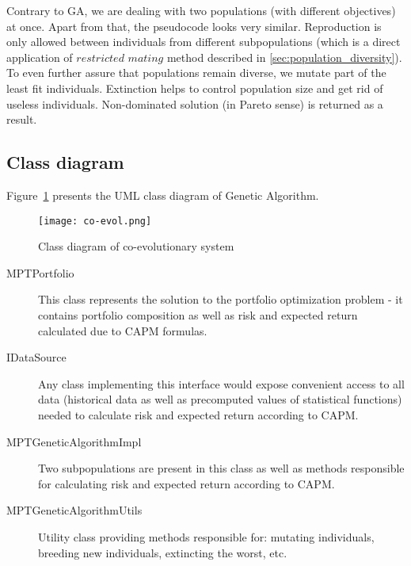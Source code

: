 Contrary to GA, we are dealing with two populations (with different objectives) at once.
Apart from that, the pseudocode looks very similar.
Reproduction is only allowed between individuals from different subpopulations (which is a direct application of $restricted$ $mating$ method
 described in \ref{sec:population_diversity}).
To even further assure that populations remain diverse, we mutate part of the least fit individuals.
Extinction helps to control population size and get rid of useless individuals.
Non-dominated solution (in Pareto sense) is returned as a result.

\subsection{Class diagram}
\label{Co-evol-class-diagram}

Figure~\ref{fig:GA_UML} presents the UML class diagram of Genetic Algorithm.

\begin{figure}[ht]   
	    \begin{center}
	      \texttt{[image: co-evol.png]}
	    \end{center}
	    \caption{Class diagram of co-evolutionary system} 
	    \label{fig:GA_UML}
	  \end{figure}

\begin{description}
    \item [MPTPortfolio]
	This class represents the solution to the portfolio optimization problem - it contains portfolio composition as well as risk and expected return calculated
	due to CAPM formulas.
    \item [IDataSource]
	Any class implementing this interface would expose convenient access to all data (historical data as well as precomputed values of statistical functions)
	needed to calculate risk and expected return according to CAPM.
    \item [MPTGeneticAlgorithmImpl]
	Two subpopulations are present in this class as well as methods responsible for calculating risk and expected return according to CAPM. 
	    
    \item [MPTGeneticAlgorithmUtils]
	Utility class providing methods responsible for: mutating individuals, breeding new individuals, extincting the worst, etc. 
    
\end{description}




